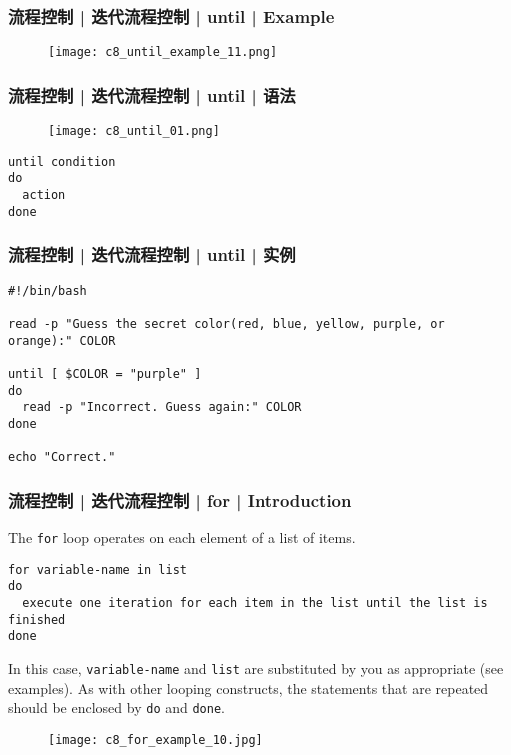 \begin{frame}
  \frametitle{流程控制 | 迭代流程控制 | until | Example}
  \begin{figure}
    \centering
    \texttt{[image: c8\_until\_example\_11.png]}
  \end{figure}
\end{frame}

\begin{frame}[fragile]
  \frametitle{流程控制 | 迭代流程控制 | until | \alert{语法}}
  \begin{figure}
    \centering
    \texttt{[image: c8\_until\_01.png]}
  \end{figure}
\begin{lstlisting}
until condition
do
  action
done
\end{lstlisting}
\end{frame}

\begin{frame}[fragile]
  \frametitle{流程控制 | 迭代流程控制 | until | \alert{实例}}
\begin{lstlisting}
#!/bin/bash

read -p "Guess the secret color(red, blue, yellow, purple, or orange):" COLOR

until [ $COLOR = "purple" ]
do
  read -p "Incorrect. Guess again:" COLOR
done

echo "Correct."
\end{lstlisting}
\end{frame}

\begin{frame}[fragile]
  \frametitle{流程控制 | 迭代流程控制 | for | Introduction}
  The \verb|for| loop operates on each element of a list of items.
  \vspace{-0.2cm}
\begin{lstlisting}
for variable-name in list
do
  execute one iteration for each item in the list until the list is finished
done
\end{lstlisting}
  \vspace{-0.1cm}
  In this case, \verb|variable-name| and \verb|list| are substituted by you as appropriate (see examples). As with other looping constructs, the statements that are repeated should be enclosed by \verb|do| and \verb|done|.
  \vspace{-0.2cm}
  \begin{figure}
    \centering
    \texttt{[image: c8\_for\_example\_10.jpg]}
  \end{figure}
\end{frame}


